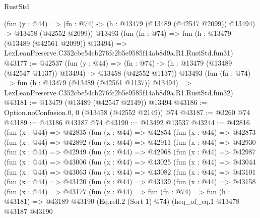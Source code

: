 \begin{lexlean}{RustStd}
\begin{coremodule}
    (fun (y : @44) =>
    (fn : @74) -> (h : @13479 (@13489 (@42547 @2099)) @13494) -> @13458 (@42552 @2099))
    @13493
    (fun (fn : @74) =>
    fun (h : @13479 (@13489 (@42561 @2099)) @13494) =>
    LexLeanPreserve.C352cbe54cb276fc2b5e9585f14ab8d9a.R1.RustStd.fun31)
@43177 := @42537
    (fun (y : @44) =>
    (fn : @74) -> (h : @13479 (@13489 (@42547 @1137)) @13494) -> @13458 (@42552 @1137))
    @13493
    (fun (fn : @74) =>
    fun (h : @13479 (@13489 (@42561 @1137)) @13494) =>
    LexLeanPreserve.C352cbe54cb276fc2b5e9585f14ab8d9a.R1.RustStd.fun32)
@43181 := @13479 (@13489 (@42547 @2149)) @13494
@43186 := Option.noConfusion.{0, 0} (@13458 (@42552 @2149)) @74
@43187 := @3260 @74
@43189 := @43186 @43187 @74
@43190 := @13492 @13537
@43244 := @42816
    (fun (x : @44) =>
    @42835
      (fun (x : @44) =>
      @42854
        (fun (x : @44) =>
        @42873
          (fun (x : @44) =>
          @42892
            (fun (x : @44) =>
            @42911
              (fun (x : @44) =>
              @42930
                (fun (x : @44) =>
                @42949
                  (fun (x : @44) =>
                  @42968
                    (fun (x : @44) =>
                    @42987
                      (fun (x : @44) =>
                      @43006
                        (fun (x : @44) =>
                        @43025
                          (fun (x : @44) =>
                          @43044
                            (fun (x : @44) =>
                            @43063
                              (fun (x : @44) =>
                              @43082
                                (fun (x : @44) =>
                                @43101
                                  (fun (x : @44) =>
                                  @43120
                                    (fun (x : @44) =>
                                    @43139
                                      (fun (x : @44) =>
                                      @43158
                                        (fun (x : @44) =>
                                        @43177
                                          (fun (x : @44) =>
                                          fun (fn : @74) =>
                                          fun (h : @43181) =>
                                          @43189
                                            @43190
                                            (Eq.refl.{2} (Sort 1) @74)
                                            (heq_of_eq.{1}
                                              @13478
                                              @43187
                                              @43190

\end{coremodule}
\end{lexlean}
